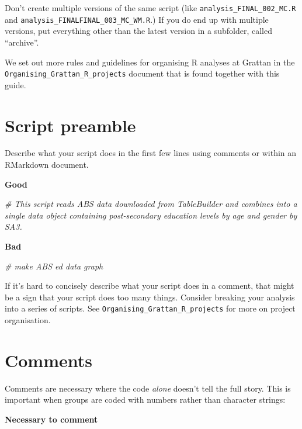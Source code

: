 \documentclass[]{book}
\newenvironment{Shaded}{\begin{snugshade}}{\end{snugshade}}
\newcommand{\CommentTok}[1]{\textcolor[rgb]{0.56,0.35,0.01}{\textit{#1}}}
\begin{document}
Don't create multiple versions of the same script (like \texttt{analysis\_FINAL\_002\_MC.R} and \texttt{analysis\_FINALFINAL\_003\_MC\_WM.R}.) If you do end up with multiple versions, put everything other than the latest version in a subfolder, called ``archive''.

We set out more rules and guidelines for organising R analyses at Grattan in the \texttt{Organising\_Grattan\_R\_projects} document that is found together with this guide.

\hypertarget{script-preamble}{%
\section{Script preamble}\label{script-preamble}}

Describe what your script does in the first few lines using comments or within an RMarkdown document.

\textbf{Good}

\begin{Shaded}
\begin{Highlighting}[]
\CommentTok{# This script reads ABS data downloaded from TableBuilder and combines into a single data object containing post-secondary education levels by age and gender by SA3. }
\end{Highlighting}
\end{Shaded}

\textbf{Bad}

\begin{Shaded}
\begin{Highlighting}[]
\CommentTok{# make ABS ed data graph}
\end{Highlighting}
\end{Shaded}

If it's hard to concisely describe what your script does in a comment, that might be a sign that your script does too many things. Consider breaking your analysis into a series of scripts. See \texttt{Organising\_Grattan\_R\_projects} for more on project organisation.

\hypertarget{comments}{%
\section{Comments}\label{comments}}

Comments are necessary where the code \emph{alone} doesn't tell the full story. This is important when groups are coded with numbers rather than character strings:

\textbf{Necessary to comment}
\end{document}
